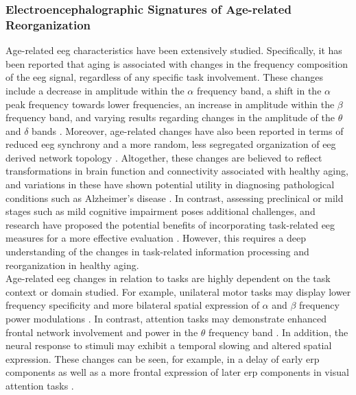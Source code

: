 \subsubsection{Electroencephalographic Signatures of Age-related Reorganization}
Age-related \gls{eeg} characteristics have been extensively studied. Specifically, it has been reported that aging is associated with changes in the frequency composition of the \gls{eeg} signal, regardless of any specific task involvement. These changes include a decrease in amplitude within the $\alpha$ frequency band, a shift in the $\alpha$ peak frequency towards lower frequencies, an increase in amplitude within the $\beta$ frequency band, and varying results regarding changes in the amplitude of the $\theta$ and $\delta$ bands \cite{Rossini2007, Ishii2017, Courtney2021}. Moreover, age-related changes have also been reported in terms of reduced \gls{eeg} synchrony and a more random, less segregated organization of \gls{eeg} derived network topology \cite{Smit2012, Samogin2022}. Altogether, these changes are believed to reflect transformations in brain function and connectivity associated with healthy aging, and variations in these have shown potential utility in diagnosing pathological conditions such as Alzheimer's disease \cite{Babiloni2021}. In contrast, assessing preclinical or mild stages such as mild cognitive impairment poses additional challenges, and research have proposed the potential benefits of incorporating task-related \gls{eeg} measures for a more effective evaluation \cite{Froehlich2021, Farina2020}. However, this requires a deep understanding of the changes in task-related information processing and reorganization in healthy aging.\\
Age-related \gls{eeg} changes in relation to tasks are highly dependent on the task context or domain studied. For example, unilateral motor tasks may display lower frequency specificity and more bilateral spatial expression of $\alpha$ and $\beta$ frequency power modulations \cite{Quandt2016}. In contrast, attention tasks may demonstrate enhanced frontal network involvement and power in the $\theta$ frequency band \cite{Hong2016}. In addition, the neural response to stimuli may exhibit a temporal slowing and altered spatial expression. These changes can be seen, for example, in a delay of early \gls{erp} components as well as a more frontal expression of later \gls{erp} components in visual attention tasks \cite{Li2013, Reuter2017}.\\
